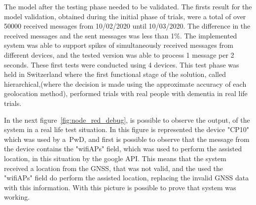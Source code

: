 The model after the testing phase needed to be validated. The firsts result for the model validation, obtained during the initial phase of trials, were a total of over 50000 received messages from 10/02/2020 until 10/03/2020. The difference in the received messages and the sent messages was less than 1\%. The implemented system was able to support spikes of simultaneously received messages from different devices, and the tested version was able to process 1 message per 2 seconds. These first tests were conducted using 4 devices. This test phase was held in Switzerland where the first functional stage of the solution, called hierarchical,(where the decision is made using the approximate accuracy of each geolocation method), performed trials with real people with dementia in real life trials.  

In the next figure~\ref{fig:node_red_debug}, is possible to observe the output, of the system in a real life test situation. In this figure is represented the device "CP10" which was used by a~\gls{PwD}, and first is possible to observe that the message from the device contains the "wifiAPs" field, which was used to perform the assisted location, in this situation by the google API. This means that the system received a location from the GNSS, that was not valid, and the used the "wifiAPs" field do perform the assisted location, replacing the invalid GNSS data with this information. With this picture is possible to prove that system was working.
